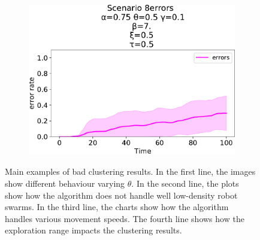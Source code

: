 \begin{figure}[!ht]
\begin{subfigure}[b]{0.32\textwidth}
    \includegraphics[width=\textwidth]{papers/swarm-intelligence2021/img/simulations/failScenario_0_08_α-0.75_θ-0.5_γ-0.1_β-7._ω-0._ζ-0._ξ-0.5_τ-0.5}
  \end{subfigure}
  \caption[Main examples of bad clustering results]{Main examples of bad clustering results.
  In the first line, the images show different behaviour varying $\theta$.
  In the second line, the plots show how the algorithm does not handle well low-density robot swarms.
  In the third line, the charts show how the algorithm handles various movement speeds.
  The fourth line shows how the exploration range impacts the clustering results.
  }
  \label{fig:bad-simulation-results}
\end{figure}